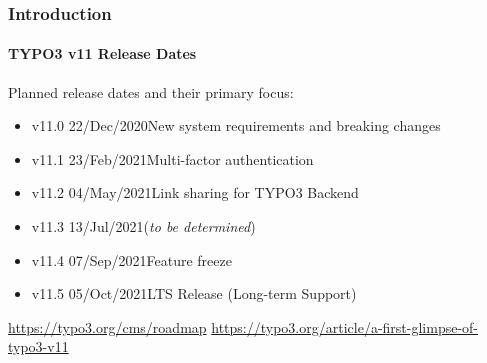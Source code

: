 %

\begin{frame}[fragile]
	\frametitle{Introduction}
	\framesubtitle{TYPO3 v11 Release Dates}

	Planned release dates and their primary focus:

	\begin{itemize}
		\item v11.0 \tabto{1.1cm}22/Dec/2020\tabto{3.4cm}New system requirements and breaking changes
		\item
			\begingroup
				\color{typo3orange}
				v11.1 \tabto{1.1cm}23/Feb/2021\tabto{3.4cm}Multi-factor authentication
			\endgroup
		\item v11.2 \tabto{1.1cm}04/May/2021\tabto{3.4cm}Link sharing for TYPO3 Backend
		\item v11.3 \tabto{1.1cm}13/Jul/2021\tabto{3.4cm}(\textit{to be determined})
		\item v11.4 \tabto{1.1cm}07/Sep/2021\tabto{3.4cm}Feature freeze
		\item v11.5 \tabto{1.1cm}05/Oct/2021\tabto{3.4cm}LTS Release (Long-term Support)

	\end{itemize}

	\smaller
		\url{https://typo3.org/cms/roadmap}\newline
		\url{https://typo3.org/article/a-first-glimpse-of-typo3-v11}
	\normalsize

\end{frame}

